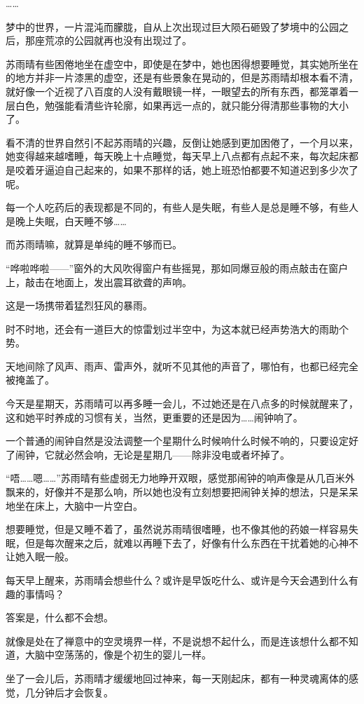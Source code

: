 ……

梦中的世界，一片混沌而朦胧，自从上次出现过巨大陨石砸毁了梦境中的公园之后，那座荒凉的公园就再也没有出现过了。

苏雨晴有些困倦地坐在虚空中，即使是在梦中，她也困得想要睡觉，其实她所坐在的地方并非一片漆黑的虚空，还是有些景象在晃动的，但是苏雨晴却根本看不清，就好像一个近视了八百度的人没有戴眼镜一样，一眼望去的所有东西，都笼罩着一层白色，勉强能看清些许轮廓，如果再远一点的，就只能分得清那些事物的大小了。

看不清的世界自然引不起苏雨晴的兴趣，反倒让她感到更加困倦了，一个月以来，她变得越来越嗜睡，每天晚上十点睡觉，每天早上八点都有点起不来，每次起床都是咬着牙逼迫自己起来的，如果不那样的话，她上班恐怕都要不知道迟到多少次了呢。

每一个人吃药后的表现都是不同的，有些人是失眠，有些人是总是睡不够，有些人是晚上失眠，白天睡不够……

而苏雨晴嘛，就算是单纯的睡不够而已。

“哗啦哗啦——”窗外的大风吹得窗户有些摇晃，那如同爆豆般的雨点敲击在窗户上，敲击在地面上，发出震耳欲聋的声响。

这是一场携带着猛烈狂风的暴雨。

时不时地，还会有一道巨大的惊雷划过半空中，为这本就已经声势浩大的雨助个势。

天地间除了风声、雨声、雷声外，就听不见其他的声音了，哪怕有，也都已经完全被掩盖了。

今天是星期天，苏雨晴可以再多睡一会儿，不过她还是在八点多的时候就醒来了，这和她平时养成的习惯有关，当然，更重要的还是因为……闹钟响了。

一个普通的闹钟自然是没法调整一个星期什么时候响什么时候不响的，只要设定好了闹钟，它就必然会响，无论是星期几——除非没电或者坏掉了。

“唔……嗯……”苏雨晴有些虚弱无力地睁开双眼，感觉那闹钟的响声像是从几百米外飘来的，好像并不是那么响，所以她也没有立刻想要把闹钟关掉的想法，只是呆呆地坐在床上，大脑中一片空白。

想要睡觉，但是又睡不着了，虽然说苏雨晴很嗜睡，也不像其他的药娘一样容易失眠，但是每次醒来之后，就难以再睡下去了，好像有什么东西在干扰着她的心神不让她入眠一般。

每天早上醒来，苏雨晴会想些什么？或许是早饭吃什么、或许是今天会遇到什么有趣的事情吗？

答案是，什么都不会想。

就像是处在了禅意中的空灵境界一样，不是说想不起什么，而是连该想什么都不知道，大脑中空荡荡的，像是个初生的婴儿一样。

坐了一会儿后，苏雨晴才缓缓地回过神来，每一天刚起床，都有一种灵魂离体的感觉，几分钟后才会恢复。

